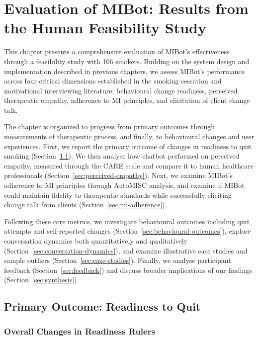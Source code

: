 \chapter{Evaluation of MIBot: Results from the Human Feasibility Study}
\label{ch:mibot-eval}

This chapter presents a comprehensive evaluation of MIBot's effectiveness through a feasibility study with 106 smokers. Building on the system design and implementation described in previous chapters, we assess MIBot's performance across four critical dimensions established in the smoking cessation and motivational interviewing literature: behavioural change readiness, perceived therapeutic empathy, adherence to MI principles, and elicitation of client change talk.

The chapter is organized to progress from primary outcomes through measurements of therapeutic process, and finally, to behavioural changes and user experiences. First, we report the primary outcome of changes in readiness to quit smoking (Section~\ref{sec:primary-outcome}). We then analyse how chatbot performed on perceived empathy, measured through the CARE scale and compare it to human healthcare professionals (Section~\ref{sec:perceived-empathy}). Next, we examine MIBot's adherence to MI principles through AutoMISC analysis, and examine if MIBot could maintain fidelity to therapeutic standards while successfully eliciting change talk from clients (Section~\ref{sec:mi-adherence}).

Following these core metrics, we investigate behavioural outcomes including quit attempts and self-reported changes (Section~\ref{sec:behavioural-outcomes}), explore conversation dynamics both quantitatively and qualitatively (Section~\ref{sec:conversation-dynamics}), and examine illustrative case studies and sample outliers (Section~\ref{sec:case-studies}). Finally, we analyse participant feedback (Section~\ref{sec:feedback}) and discuss broader implications of our findings (Section~\ref{sec:synthesis}).

\section{Primary Outcome: Readiness to Quit}
\label{sec:primary-outcome}

\subsection{Overall Changes in Readiness Rulers}

